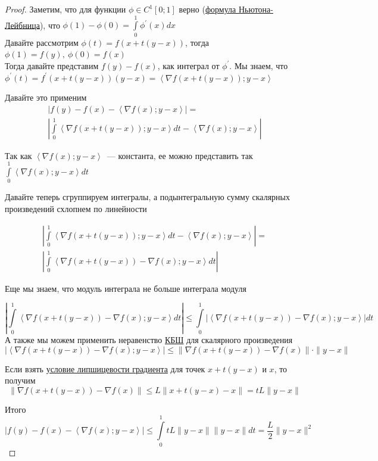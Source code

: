 \begin{proof}
  Заметим, что для функции $\phi \in C^1[0;1]$ верно (\hyperref[note:AD362344-ECDC-4627-B344-8356744E6E53]{формула Ньютона-Лейбница}), что $\phi(1) - \phi(0) = \int\limits_0^1 \phi^{\prime}(x)dx$ \\
  Давайте рассмотрим $\phi(t) = f(x + t(y-x))$, тогда $\phi(1) = f(y),\ \phi(0)=f(x)$ \\
  Тогда давайте представим $f(y)-f(x)$, как интеграл  от $\phi^{\prime}$.
  Мы знаем, что $\phi^{\prime}(t) = f^{\prime}(x + t(y-x)) (y-x) = \left\langle \nabla f(x + t(y-x)); y-x \right\rangle$

  Давайте это применим
  \begin{multline*}
  |f(y) -f(x) - \left\langle \nabla f(x); y-x  \right\rangle | =  \\
  \left| \int\limits_0^1 \left\langle \nabla f(x+t(y-x)); y-x \right\rangle dt - \left\langle \nabla f(x); y-x \right\rangle \right|
  \end{multline*}

  Так как $\left\langle \nabla f(x); y-x \right\rangle$~--- константа, ее можно представить так $\int\limits_0^1 \left\langle \nabla f(x); y-x \right\rangle dt$

  Давайте теперь сгруппируем интегралы, а подынтегральную сумму скалярных произведений
  схлопнем по линейности

  \begin{multline*}
  \left| \int\limits_0^1 \left\langle \nabla f(x+t(y-x)); y-x \right\rangle dt - \left\langle \nabla f(x); y-x \right\rangle \right| = \\
  \left| \int\limits_0^1 \left\langle \nabla f(x + t(y-x)) - \nabla f(x); y-x \right\rangle dt\right|
  \end{multline*}

  Еще мы знаем, что модуль интеграла не больше интеграла модуля

  \[
  \left| \int\limits_0^1 \left\langle \nabla f(x + t(y-x)) - \nabla f(x); y-x \right\rangle dt\right| \le
   \int\limits_0^1 \left| \left\langle \nabla f(x + t(y-x)) - \nabla f(x); y-x \right\rangle \right| dt
  \]
  А также мы можем применить неравенство \hyperref[note:D0601ACD-8C91-4A93-B0E4-AC0D529C6A5C]{КБШ} для скалярного произведения
  \[
  \left| \left\langle \nabla f(x + t(y-x)) - \nabla f(x); y-x \right\rangle \right| \le \| \nabla f(x + t(y-x)) - \nabla f(x) \| \cdot \| y-x \|
  \]

  Если взять \hyperref[note:7DD1C7AB-1A49-4675-9F21-5A16C717F670]{условие липшицевости градиента} для точек $x + t(y-x)$ и $x$, то получим
  \[
  \| \nabla f(x +  t(y-x)) - \nabla f(x) \| \le L \| x + t(y-x) - x \| = t L \| y-x\|
  \]

  Итого
  \[
  \left| f(y) -f(x) - \left\langle \nabla f(x); y-x \right\rangle \right| \le \int\limits_{0}^1 t L \| y -x \|  \| y -x \| dt =  \frac{L}{2} \| y -x \|^2
  \]
\end{proof}
